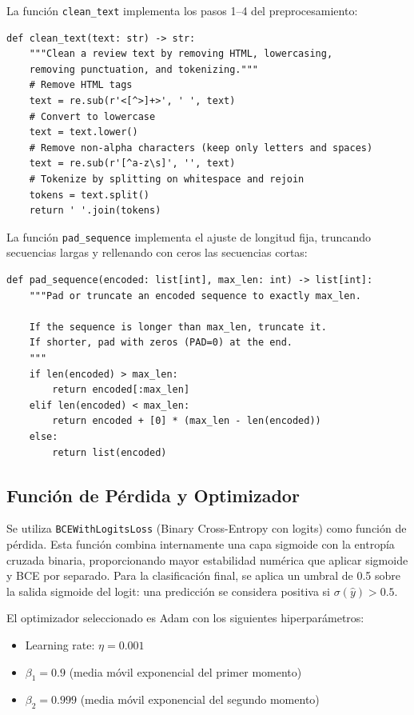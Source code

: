 La función \texttt{clean\_text} implementa los pasos 1--4 del preprocesamiento:

\begin{verbatim}
def clean_text(text: str) -> str:
    """Clean a review text by removing HTML, lowercasing,
    removing punctuation, and tokenizing."""
    # Remove HTML tags
    text = re.sub(r'<[^>]+>', ' ', text)
    # Convert to lowercase
    text = text.lower()
    # Remove non-alpha characters (keep only letters and spaces)
    text = re.sub(r'[^a-z\s]', '', text)
    # Tokenize by splitting on whitespace and rejoin
    tokens = text.split()
    return ' '.join(tokens)
\end{verbatim}

La función \texttt{pad\_sequence} implementa el ajuste de longitud fija, truncando secuencias
largas y rellenando con ceros las secuencias cortas:

\begin{verbatim}
def pad_sequence(encoded: list[int], max_len: int) -> list[int]:
    """Pad or truncate an encoded sequence to exactly max_len.

    If the sequence is longer than max_len, truncate it.
    If shorter, pad with zeros (PAD=0) at the end.
    """
    if len(encoded) > max_len:
        return encoded[:max_len]
    elif len(encoded) < max_len:
        return encoded + [0] * (max_len - len(encoded))
    else:
        return list(encoded)
\end{verbatim}

\subsection{Función de Pérdida y Optimizador}

Se utiliza \texttt{BCEWithLogitsLoss} (Binary Cross-Entropy con logits) como función de
pérdida. Esta función combina internamente una capa sigmoide con la entropía cruzada
binaria, proporcionando mayor estabilidad numérica que aplicar sigmoide y BCE por separado.
Para la clasificación final, se aplica un umbral de 0.5 sobre la salida sigmoide del logit:
una predicción se considera positiva si $\sigma(\hat{y}) > 0.5$.

El optimizador seleccionado es Adam \cite{kingma2015} con los siguientes hiperparámetros:
\begin{itemize}
    \item Learning rate: $\eta = 0.001$
    \item $\beta_1 = 0.9$ (media móvil exponencial del primer momento)
    \item $\beta_2 = 0.999$ (media móvil exponencial del segundo momento)
\end{itemize}


